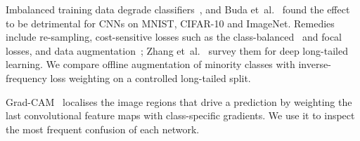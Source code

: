 Imbalanced training data degrade classifiers~\cite{he2009imbalanced}, and Buda et~al.~\cite{buda2018imbalance} found the effect to be detrimental for CNNs on MNIST, CIFAR-10 and ImageNet.
Remedies include re-sampling, cost-sensitive losses such as the class-balanced~\cite{cui2019classbalanced} and focal~\cite{lin2017focal} losses, and data augmentation~\cite{shorten2019augmentation}; Zhang et~al.~\cite{zhang2023longtail} survey them for deep long-tailed learning.
We compare offline augmentation of minority classes with inverse-frequency loss weighting on a controlled long-tailed split.

Grad-CAM~\cite{selvaraju2017gradcam} localises the image regions that drive a prediction by weighting the last convolutional feature maps with class-specific gradients.
We use it to inspect the most frequent confusion of each network.
